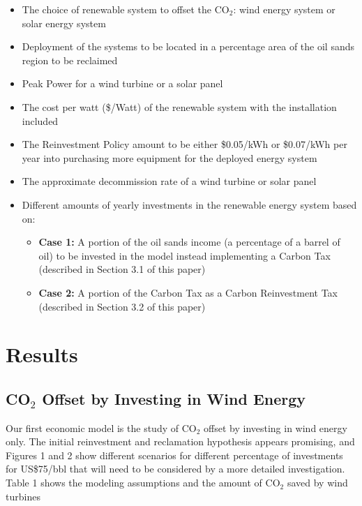 \documentclass[11pt]{article}
\begin{document}
\begin{itemize}
\item The choice of renewable system to offset the CO$_2$: wind energy system or solar energy system
\item Deployment of the systems to be located in a percentage area of the oil sands region to be reclaimed
\item Peak Power for a wind turbine or a solar panel
\item The cost per watt (\$/Watt) of the renewable system with the installation included
\item The Reinvestment Policy amount to be either \$0.05/kWh or \$0.07/kWh per year into purchasing more equipment for the deployed energy system 
\item The approximate decommission rate of a wind turbine or solar panel 
\item Different amounts of yearly investments in the renewable energy system based on: 
\begin{itemize}
\item {\bf Case 1:} A portion of the oil sands income (a percentage of a barrel of oil) to be invested in the model instead implementing a Carbon Tax (described in Section 3.1 of this paper)
\item {\bf Case 2:} A portion of the Carbon Tax as a Carbon Reinvestment Tax (described in Section 3.2 of this paper)
\end{itemize}
\end{itemize}


\section{Results}

\subsection{CO$_2$ Offset by Investing in Wind Energy}

Our first economic model is the study of CO$_2$ offset by investing in wind energy only. The initial reinvestment and reclamation hypothesis appears promising, and Figures 1 and 2 show different scenarios for different percentage of investments for US\$75/bbl that will need to be considered by a more detailed investigation.  Table 1 shows the modeling assumptions and the amount of CO$_2$ saved by wind turbines 
\end{document}
